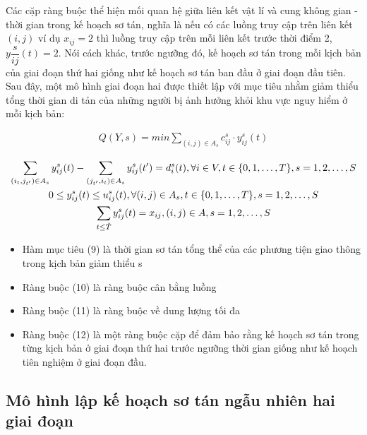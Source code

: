 \documentclass[a4paper]{article}
\begin{document}
    Các cặp ràng buộc thể hiện mối quan hệ giữa liên kết vật lí và cung không gian - thời gian trong kế hoạch sơ tán, 
    nghĩa là nếu có các luồng truy cập trên liên kết $(i,j)$ ví dụ $x_{ij}=2$ thì luồng truy cập trên mỗi liên kết trước thời điểm 2, $y\dfrac{s}{ij}(t)=2$. 
    Nói cách khác, trước ngưỡng đó, kế hoạch sơ tán trong mỗi kịch bản của giai đoạn thứ hai giống như kế hoạch sơ tán ban đầu ở giai đoạn đầu tiên. 
    Sau đây, một mô hình giai đoạn hai được thiết lập với mục tiêu nhằm giảm thiểu tổng thời gian di tản của những người bị ảnh hưởng khỏi khu vực nguy hiểm ở mỗi kịch bản: 

    \begin{gather}
        Q(Y,s) = min \sum\limits_{(i,j) \in A_s} c_{ij}^s \cdot y_{ij}^s(t)
    \end{gather}

    \hspace*{2.5cm} 

    \begin{gather}
        \sum\limits_{(i_t,j_{t'}) \in A_s} y_{ij}^s(t) - \sum\limits_{(j_{t'},i_t) \in A_s} y_{ij}^s(t') = d_i^s(t), \forall i \in V, t \in \{0,1, \dotsc, T \}, s = 1, 2, \dots, S\\
        0 \leq y_{ij}^s(t) \leq u_{ij}^s(t), \forall (i,j) \in A_s, t \in \{0,1, \dotsc, T \}, s = 1, 2, \dots, S\\
        \sum\limits_{t \leq \Tilde{T}} y_{ij}^s(t) = x_{ij}, (i,j) \in A, s = 1, 2, \dots, S
    \end{gather}

    \begin{itemize}
        \item Hàm mục tiêu (9) là thời gian sơ tán tổng thể của các phương tiện giao thông trong kịch bản giảm thiểu s
        \item Ràng buộc (10) là ràng buộc cân bằng luồng
        \item Ràng buộc (11) là ràng buộc về dung lượng tối đa 
        \item Ràng buộc (12) là một ràng buộc cặp để đảm bảo rằng kế hoạch sơ tán trong từng kịch bản ở giai đoạn thứ hai trước ngưỡng thời gian giống như kế hoạch tiên nghiệm ở giai đoạn đầu.
    \end{itemize}

    \subsection{Mô hình lập kế hoạch sơ tán ngẫu nhiên hai giai đoạn}
\end{document}
